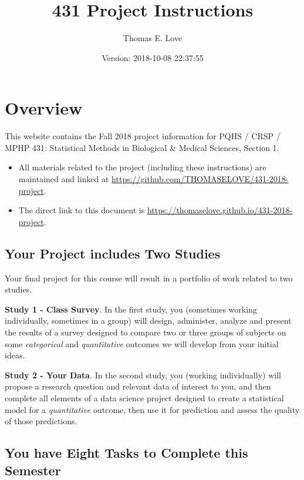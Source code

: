 \documentclass[]{book}
\title{431 Project Instructions}
\author{Thomas E. Love}
\date{Version: 2018-10-08 22:37:55}
\providecommand{\tightlist}{%
  \setlength{\itemsep}{0pt}\setlength{\parskip}{0pt}}
\theoremstyle{definition}
\theoremstyle{definition}
\theoremstyle{definition}
\theoremstyle{remark}
\begin{document}
\maketitle

{
\setcounter{tocdepth}{1}
\tableofcontents
}
\hypertarget{overview}{%
\chapter*{Overview}\label{overview}}

This website contains the Fall 2018 project information for PQHS / CRSP
/ MPHP 431: Statistical Methods in Biological \& Medical Sciences,
Section 1.

\begin{itemize}
\tightlist
\item
  All materials related to the project (including these instructions)
  are maintained and linked at
  \url{https://github.com/THOMASELOVE/431-2018-project}.
\item
  The direct link to this document is
  \url{https://thomaselove.github.io/431-2018-project}.
\end{itemize}

\hypertarget{your-project-includes-two-studies}{%
\section*{Your Project includes Two
Studies}\label{your-project-includes-two-studies}}

Your final project for this course will result in a portfolio of work
related to two studies.

\textbf{Study 1 - Class Survey}. In the first study, you (sometimes
working individually, sometimes in a group) will design, administer,
analyze and present the results of a survey designed to compare two or
three groups of subjects on some \emph{categorical} and
\emph{quantitative} outcomes we will develop from your initial ideas.

\textbf{Study 2 - Your Data}. In the second study, you (working
individually) will propose a research question and relevant data of
interest to you, and then complete all elements of a data science
project designed to create a statistical model for a \emph{quantitative}
outcome, then use it for prediction and assess the quality of those
predictions.

\hypertarget{you-have-eight-tasks-to-complete-this-semester}{%
\section*{You have Eight Tasks to Complete this
Semester}\label{you-have-eight-tasks-to-complete-this-semester}}
\end{document}
